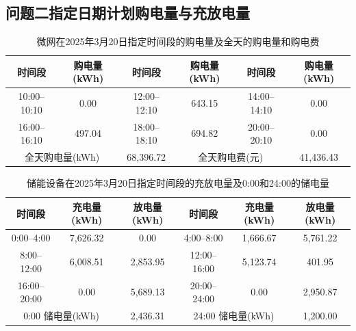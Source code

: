 \subsection*{问题二指定日期计划购电量与充放电量}

\begin{table}[H]
  \centering
  \caption{微网在2025年3月20日指定时间段的购电量及全天的购电量和购电费}
  \label{tab:q2-purchase-0320}
  \small
  \renewcommand{\arraystretch}{1.3}
  \begin{tabular}{|c|c|c|c|c|c|}
    \hline
    时间段 & 购电量(kWh) & 时间段 & 购电量(kWh) & 时间段 & 购电量(kWh) \\
    \hline
    10:00--10:10 & 0.00 & 12:00--12:10 & 643.15 & 14:00--14:10 & 0.00 \\
    \hline
    16:00--16:10 & 497.04 & 18:00--18:10 & 694.82 & 20:00--20:10 & 0.00 \\
    \hline
    \multicolumn{2}{|c|}{全天购电量(kWh)}
    & \multicolumn{1}{c|}{68{,}396.72}
    & \multicolumn{2}{c|}{全天购电费(元)}
    & \multicolumn{1}{c|}{41{,}436.43} \\
    \hline
  \end{tabular}
\end{table}

\begin{table}[H]
  \centering
  \caption{储能设备在2025年3月20日指定时间段的充放电量及0:00和24:00的储电量}
  \label{tab:q2-storage-0320}
  \small
  \renewcommand{\arraystretch}{1.3}
  \begin{tabular}{|c|c|c|c|c|c|}
    \hline
    时间段 & 充电量(kWh) & 放电量(kWh)
    & 时间段 & 充电量(kWh) & 放电量(kWh) \\
    \hline
    0:00--4:00 & 7{,}626.32 & 0.00
    & 4:00--8:00 & 1{,}666.67 & 5{,}761.22 \\
    \hline
    8:00--12:00 & 6{,}008.51 & 2{,}853.95
    & 12:00--16:00 & 5{,}123.74 & 401.95 \\
    \hline
    16:00--20:00 & 0.00 & 5{,}689.13
    & 20:00--24:00 & 0.00 & 2{,}950.87 \\
    \hline
    \multicolumn{2}{|c|}{0:00 储电量(kWh)}
    & \multicolumn{1}{c|}{2{,}436.31}
    & \multicolumn{2}{c|}{24:00 储电量(kWh)}
    & \multicolumn{1}{c|}{1{,}200.00} \\
    \hline
  \end{tabular}
\end{table}

